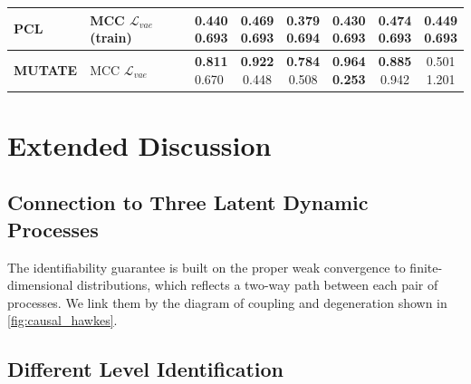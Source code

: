 \documentclass[10pt]{article}
\numberwithin{figure}{section}
\begin{document}
\begin{table}[htbp]
{{\begin{tabular}{@{}lllccccc@{}}
PCL & 
\makecell[l]{MCC \\ $\mathcal{L}_{vae}$(train)} & 
\makecell[l]{0.440\\0.693} & \makecell[c]{0.469\\0.693} & \makecell[c]{0.379\\0.694} & \makecell[c]{0.430\\0.693} & \makecell[c]{\cellcolor{gray!20}\textbf{0.474}\\\cellcolor{gray!20}\textbf{0.693}} & \makecell[c]{0.449\\0.693} \\
\midrule \vspace{-2.5pt}
\textbf{MUTATE} & 
\makecell[l]{MCC \\ $\mathcal{L}_{vae}$} & 
\makecell[l]{\cellcolor{gray!20}\textbf{0.811}\\0.670}& \makecell[c]{\cellcolor{gray!20}\textbf{0.922}\\0.448}& \makecell[c]{\cellcolor{gray!20}\textbf{0.784}\\0.508} & \makecell[c]{\cellcolor{gray!20}\textbf{0.964} \\\cellcolor{gray!20}\textbf{0.253}}& \makecell[c]{\cellcolor{gray!20}\textbf{0.885}\\0.942} & \makecell[c]{0.501\\1.201} \\
\bottomrule
\end{tabular}
}
 }
\end{table}







\section{Extended Discussion}

\subsection{Connection to Three Latent Dynamic Processes}

The identifiability guarantee is built on the proper weak convergence to finite-dimensional distributions, which reflects a two-way path between each pair of processes.  We link them by the diagram of coupling and degeneration shown in \ref{fig:causal_hawkes}.

\subsection{Different Level Identification }
\end{document}
